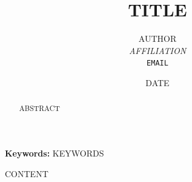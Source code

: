 \documentclass[11pt,a4paper]{article}
\title{{{TITLE}}}
\author{{{AUTHOR}} \\ \textit{{{AFFILIATION}}} \\ \texttt{{{EMAIL}}}}
\date{{{DATE}}}
\begin{document}
\maketitle

\begin{abstract}
{{ABSTRACT}}
\end{abstract}

\noindent\textbf{Keywords:} {{KEYWORDS}}

\newpage
\tableofcontents
\newpage


{{CONTENT}}

\newpage


\end{document}
